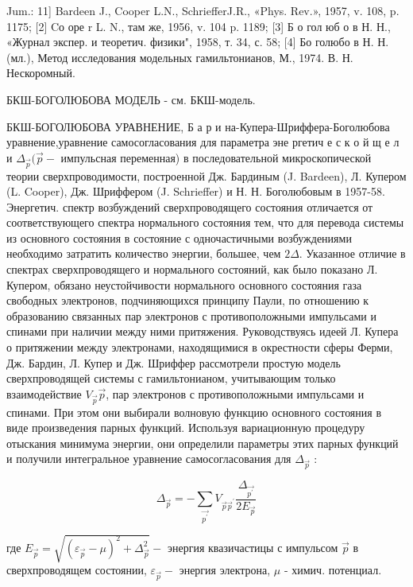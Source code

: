 \documentclass[10pt]{article}
\begin{document}
Jum.: 11] Bardeen J., Cooper L.N., SchriefferJ.R., «Phys. Rev.», 1957, v. 108, p. 1175; [2] Cо оре r L. N., там же, 1956, v. 104 p. 1189; [3] Б о гол юб о в Н. Н., «Журнал экспер. и теоретич. физики", 1958, т. 34, с. 58; [4] Бо голюбо в Н. Н. (мл.), Метод исследования модельных гамильтонианов, М., 1974. В. Н. Нескоромный.



БКШ-БОГОЛЮБОВА МОДЕЛЬ - см. БКШ-модель.



БКШ-БОГОЛЮБОВА УРАВНЕНИЕ, Б а р и на-Купера-Шриффера-Боголюбова уравнение,уравнение самосогласования для параметра эне ргетич е с к о й щ е л и $\Delta_{\vec{p}}(\vec{p}-$ импульсная переменная) в последовательной микроскопической теории сверхпроводимости, построенной Дж. Бардиным (J. Bardeen), Л. Купером (L. Cooper), Дж. Шриффером (J. Schrieffer) и Н. Н. Боголюбовым в 1957-58. Энергетич. спектр возбуждений сверхпроводящего состояния отличается от соответствующего спектра нормального состояния тем, что для перевода системы из основного состояния в состояние с одночастичными возбуждениями необходимо затратить количество энергии, большее, чем $2 \Delta$. Указанное отличие в спектрах сверхпроводящего и нормального состояний, как было показано Л. Купером, обязано неустойчивости нормального основного состояния газа свободных электронов, подчиняющихся принципу Паули, по отношению к образованию связанных пар электронов с противоположными импульсами и спинами при наличии между ними притяжения. Руководствуясь идеей Л. Купера о притяжении между электронами, находящимися в окрестности сферы Ферми, Дж. Бардин, Л. Купер и Дж. Шриффер рассмотрели простую модель сверхпроводящей системы с гамильтонианом, учитывающим только взаимодействие $V_{\vec{p}} \vec{p}$, пар электронов с противоположными импульсами и спинами. При этом они выбирали волновую функцию основного состояния в виде произведения парных функций. Используя вариационную процедуру отыскания минимума энергии, они определили параметры этих парных функций и получили интегральное уравнение самосогласования для $\Delta_{\vec{p}}$ :



\[

\Delta_{\vec{p}}=-\sum_{\overrightarrow{p^{\prime}}} V_{\vec{p} \vec{p}^{\prime}} \frac{\Delta_{\overrightarrow{p^{\prime}}}}{2 E_{\vec{p}}}

\]



где $E_{\vec{p}}=\sqrt{\left(\varepsilon_{\vec{p}}-\mu\right)^{2}+\Delta_{\vec{p}}^{2}}-$ энергия квазичастицы с импульсом $\vec{p}$ в сверхпроводящем состоянии, $\varepsilon_{\vec{p}}-$ энергия электрона, $\mu$ - химич. потенциал.
\end{document}
